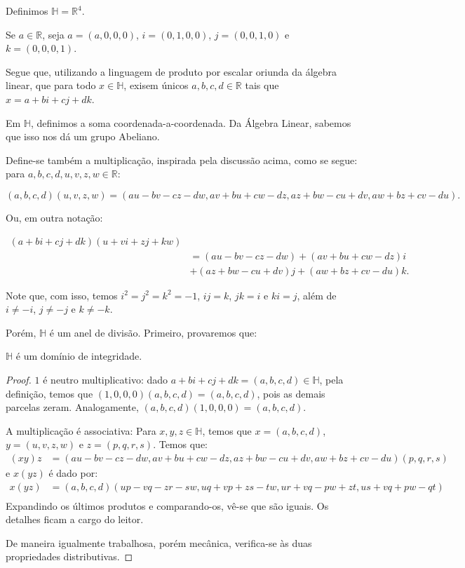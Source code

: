 \begin{definition}[Quaternions]
    Definimos $\mathbb H=\mathbb R^4$.
    
    Se $a \in \mathbb R$, seja $a=(a, 0, 0, 0)$, $i=(0, 1, 0, 0)$, $j=(0, 0, 1, 0)$ e $k=(0, 0, 0, 1)$.

    Segue que, utilizando a linguagem de produto por escalar oriunda da álgebra linear, que para todo $x \in \mathbb H$, exisem únicos $a, b, c, d \in \mathbb R$ tais que $x=a+bi+cj+dk$.

    Em $\mathbb H$, definimos a soma coordenada-a-coordenada. Da Álgebra Linear, sabemos que isso nos dá um grupo Abeliano.

    Define-se também a multiplicação, inspirada pela discussão acima, como se segue: para $a, b, c, d, u, v, z, w \in \mathbb R$:

    \begin{equation*}
        (a, b, c, d)(u, v, z, w)=(au-bv-cz-dw, av+bu+cw-dz, az+bw-cu+dv, aw+bz+cv-du).
    \end{equation*}

    Ou, em outra notação:

    \begin{align*}
    (a+bi+cj+dk)(u+vi+zj+kw)& \\
    &=(au-bv-cz-dw)+(av+bu+cw-dz)i\\
    &+(az+bw-cu+dv)j+(aw+bz+cv-du)k.
    \end{align*}
\end{definition}

Note que, com isso, temos $i^2=j^2=k^2=-1$, $ij=k$, $jk=i$ e $ki=j$, além de $i\neq -i$, $j\neq -j$ e $k\neq -k$.

Porém, $\mathbb H$ é um anel de divisão. Primeiro, provaremos que:

\begin{prop}
    $\mathbb H$ é um domínio de integridade.
\end{prop}
\begin{proof}
    $1$ é neutro multiplicativo: dado $a+bi+cj+dk=(a, b, c, d)\in \mathbb H$, pela definição, temos que $(1, 0, 0, 0)(a, b, c, d)=(a, b, c, d)$, pois as demais parcelas zeram. Analogamente, $(a, b, c, d)(1, 0, 0, 0)=(a, b, c, d)$.
    
    A multiplicação é associativa:
    Para $x, y, z \in \mathbb H$, temos que $x=(a, b, c, d)$, $y=(u, v, z, w)$ e $z=(p, q, r, s)$. Temos que:
    \begin{align*}
        (xy)z &=(au-bv-cz-dw, av+bu+cw-dz, az+bw-cu+dv, aw+bz+cv-du)(p,q,r,s)
    \end{align*}
    e $x(yz)$ é dado por:
    \begin{align*}
    x(yz) &=(a, b, c, d)(up-vq-zr-sw, uq+vp+zs-tw, ur+vq-pw+zt, us+vq+pw-qt)\\
    \end{align*}
    Expandindo os últimos produtos e comparando-os, vê-se que são iguais. Os detalhes ficam a cargo do leitor.

    De maneira igualmente trabalhosa, porém mecânica, verifica-se às duas propriedades distributivas.
\end{proof}

